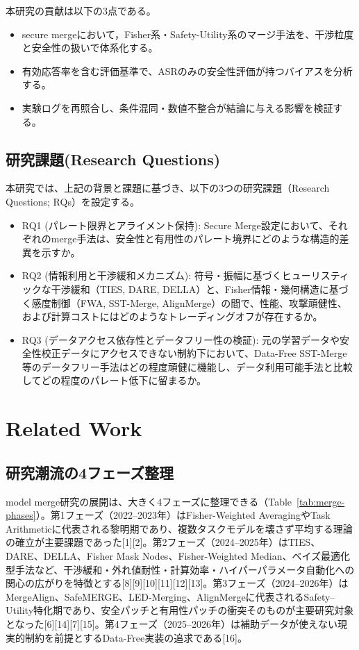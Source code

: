 \documentclass{article}
\begin{document}
本研究の貢献は以下の3点である。

\begin{itemize}
\item  secure mergeにおいて，Fisher系・Safety-Utility系のマージ手法を、干渉粒度と安全性の扱いで体系化する。
\item  有効応答率を含む評価基準で、ASRのみの安全性評価が持つバイアスを分析する。
\item  実験ログを再照合し、条件混同・数値不整合が結論に与える影響を検証する。
\end{itemize}



\subsection{研究課題(Research Questions)}
\label{gen_inst}
本研究では、上記の背景と課題に基づき、以下の3つの研究課題（Research Questions; RQs）を設定する。

\begin{itemize}
\item RQ1 (パレート限界とアライメント保持): Secure Merge設定において、それぞれのmerge手法は、安全性と有用性のパレート境界にどのような構造的差異を示すか。
\item RQ2 (情報利用と干渉緩和メカニズム): 符号・振幅に基づくヒューリスティックな干渉緩和（TIES, DARE, DELLA）と、Fisher情報・幾何構造に基づく感度制御（FWA, SST-Merge, AlignMerge）の間で、性能、攻撃頑健性、および計算コストにはどのようなトレーディングオフが存在するか。
\item RQ3 (データアクセス依存性とデータフリー性の検証): 元の学習データや安全性校正データにアクセスできない制約下において、Data-Free SST-Merge等のデータフリー手法はどの程度頑健に機能し、データ利用可能手法と比較してどの程度のパレート低下に留まるか。
\end{itemize}

\section{Related Work}

\subsection{研究潮流の4フェーズ整理}

model merge研究の展開は、大きく4フェーズに整理できる（Table~\ref{tab:merge-phases}）。第1フェーズ（2022–2023年）はFisher-Weighted AveragingやTask Arithmeticに代表される黎明期であり、複数タスクモデルを壊さず平均する理論の確立が主要課題であった[1][2]。第2フェーズ（2024–2025年）はTIES、DARE、DELLA、Fisher Mask Nodes、Fisher-Weighted Median、ベイズ最適化型手法など、干渉緩和・外れ値耐性・計算効率・ハイパーパラメータ自動化への関心の広がりを特徴とする[8][9][10][11][12][13]。第3フェーズ（2024–2026年）はMergeAlign、SafeMERGE、LED-Merging、AlignMergeに代表されるSafety–Utility特化期であり、安全パッチと有用性パッチの衝突そのものが主要研究対象となった[6][14][7][15]。第4フェーズ（2025–2026年）は補助データが使えない現実的制約を前提とするData-Free実装の追求である[16]。
\end{document}
